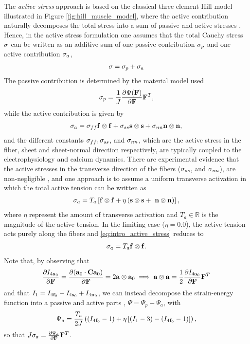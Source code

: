 The \emph{active stress} approach is based on the classical three element
Hill model illustrated in Figure \ref{fig:hill_muscle_model}, where the
active contribution naturally decomposes the total stress into a sum
of passive and active stresses
\cite{nash2004electromechanical}. Hence, in the active stress
formulation \cite{hunter1998modelling} one assumes that the total
Cauchy stress $\mathbf{\sigma}$ can be written as an additive sum of one
passive contribution $\mathbf{\sigma}_p$ and one active contribution $\mathbf{\sigma}_a$,
\begin{align}
  \mathbf{\sigma} = \mathbf{\sigma}_p + \mathbf{\sigma}_a
\end{align}
The passive contribution is determined by the material model used
\begin{align}
 \mathbf{\sigma}_p = \frac{1}{J} \frac{\partial \Psi(\mathbf{F})}{\partial \mathbf{F}} \mathbf{F}^{T},
\end{align}
while the active contribution is given by 
\begin{align}
  \mathbf{\sigma}_a = \mathbf{\sigma}_{ff} \mathbf{f} \otimes \mathbf{f} +
  \mathbf{\sigma}_{ss} \mathbf{s} \otimes \mathbf{s} +
  \mathbf{\sigma}_{nn} \mathbf{n} \otimes \mathbf{n},
\end{align}
and the different constants $\mathbf{\sigma}_{ff}, \mathbf{\sigma}_{ss}$, and
$\mathbf{\sigma}_{nn}$, which are the active stress in the fiber, sheet and
sheet-normal direction respectively, are typically coupled to the
electrophysiology and calcium dynamics.
There are experimental evidence that the active stresses in the
transverse direction of the fibers ($\mathbf{\sigma}_{ss}$, and $\mathbf{\sigma}_{nn}$),
are non-negligible \cite{lin1998multiaxial}, and one approach is to assume
a uniform transverse activation in which the total active tension
can be written as 
\begin{align}
  \mathbf{\sigma}_a = T_a \left[\mathbf{f} \otimes \mathbf{f} +
   \eta\left( \mathbf{s} \otimes \mathbf{s} +
  \ \mathbf{n} \otimes \mathbf{n} \right)\right],
  \label{eq:intro_active_stress}
\end{align}
where $\eta$ represent the amount of transverse activation and $T_a
\in \mathbb{R}$ is the magnitude of the active tension.
In the limiting case ($\eta = 0.0$), the active tension acts purely
along the fibers and \eqref{eq:intro_active_stress} reduces to 
\begin{align}
  \mathbf{\sigma}_a = T_a \mathbf{f} \otimes \mathbf{f}.
\end{align}
Note that, by observing  that
\begin{align*}
  \frac{\partial I_{4\mathbf{a}_0}}{\partial \mathbf{F}}
  = \frac{\partial (\mathbf{a}_0  \cdot \mathbf{C} \mathbf{a}_0 )}{\partial \mathbf{F}}
  = 2 \mathbf{a} \otimes \mathbf{a}_0 \implies
  \mathbf{a} \otimes  \mathbf{a}= \frac{1}{2} \frac{\partial I_{4\mathbf{a}_0}}{\partial \mathbf{F}} \mathbf{F}^{T}
\end{align*}
and that $I_1 =  I_{4\mathbf{f}_0} +  I_{4\mathbf{s}_0} +  I_{4\mathbf{n}_0}$, 
we can instead decompose the strain-energy function into a passive and active
parts \cite{pathmanathan2010cardiac}, $\Psi= \Psi_p + \Psi_a$, with
\begin{align}
\Psi_a = \frac{T_a}{2J} \left(( I_{4\mathbf{f}_0} - 1)  + \eta \left[ (I_1 - 3) -
    (I_{4\mathbf{f}_0} - 1)\right] \right), 
\end{align}
so that $J \mathbf{\sigma}_a  = \frac{\partial \Psi_a}{\partial \mathbf{F}}
\mathbf{F}^{T}$.

